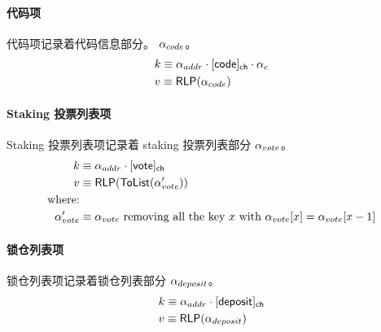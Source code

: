 \paragraph{代码项} 代码项记录着代码信息部分。 $\mathbf{\alpha}_{code}$。 
\begin{align}
	&k\equiv \alpha_{addr}\cdot [{\sf code}]_{\sf ch}\cdot \alpha_c  \\
	&v\equiv \mathsf{RLP}(\mathbf{\alpha}_{code})
\end{align}

\paragraph{ Staking 投票列表项} Staking 投票列表项记录着 staking 投票列表部分 $\mathbf{\alpha}_{vote}$。 
\begin{align}
	k&\equiv \alpha_{addr}\cdot [{\sf vote}]_{\sf ch}  \\
	v&\equiv \mathsf{RLP}(\mathsf{ToList}(\mathbf{\alpha}'_{vote}))\\
	\mbox{where:}&\notag\\ 
	\mathbf{\alpha}'_{vote} &\equiv \mbox{$\mathbf{\alpha}_{vote}$ removing all the key $x$ with $\mathbf{\alpha}_{vote}[x]=\mathbf{\alpha}_{vote}[x-1]$}
\end{align}

\paragraph{锁仓列表项} 锁仓列表项记录着锁仓列表部分 $\mathbf{\alpha}_{deposit}$。 
\begin{align}
	&k\equiv \alpha_{addr}\cdot [{\sf deposit}]_{\sf ch}  \\
	&v\equiv \mathsf{RLP}(\mathbf{\alpha}_{deposit})
\end{align}

